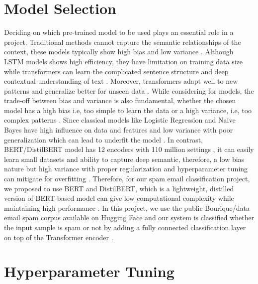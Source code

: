 \documentclass[11pt]{article}
\begin{document}
\section{Model Selection}
Deciding on which pre-trained model to be used plays an essential role in a project. Traditional methods cannot capture the semantic relationships of the context, these models typically show high bias and low variance \cite{geron2019hands}. Although LSTM models shows high efficiency, they have limitation on training data size while transformers can learn the complicated sentence structure and deep contextual understanding of text \cite{vaswani2017attention}. Moreover, transformers adapt well to new patterns and generalize better for unseen data \cite{devlin2018bert}. While considering for models, the trade-off between bias and variance is also fundamental, whether the chosen model has a high bias i.e, too simple to learn the data or a high variance, i.e, too complex patterns \cite{bishop2006pattern}. Since classical models like Logistic Regression and Naive Bayes have high influence on data and features and low variance with poor generalization which can lead to underfit the model \cite{hastie2009elements}. In contrast, BERT/DistilBERT model has 12 encoders with 110 million settings \cite{shazad2024spam}, it can easily learn small datasets and ability to capture deep semantic, therefore, a low bias nature but high variance with proper regularization and hyperparameter tuning can mitigate for overfitting \cite{sanh2019distilbert}. Therefore, for our spam email classification project, we proposed to use BERT and DistilBERT, which is a lightweight, distilled version of BERT-based model can give low computational complexity while maintaining high performance \cite{sanh2019distilbert}. In this project, we use the public Bourique/data email spam corpus available on Hugging Face and our system is classified whether the input sample is spam or not by adding a fully connected classification layer on top of the Transformer encoder \cite{devlin2018bert}.



\section{Hyperparameter Tuning}
\end{document}
